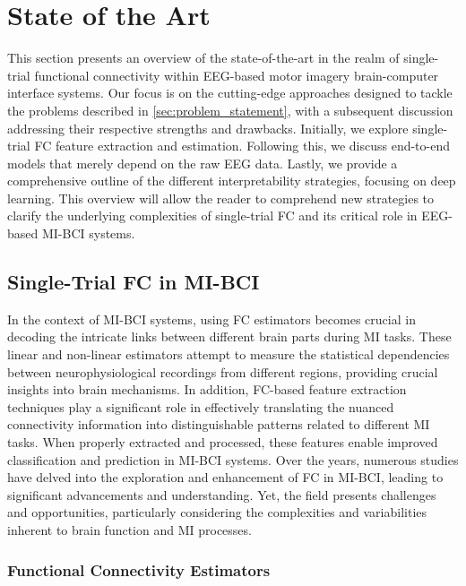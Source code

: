 \section{State of the Art}

This section presents an overview of the state-of-the-art in the realm of single-trial functional connectivity within EEG-based motor imagery brain-computer interface systems. Our focus is on the cutting-edge approaches designed to tackle the problems described in \cref{sec:problem_statement}, with a subsequent discussion addressing their respective strengths and drawbacks. Initially, we explore single-trial FC feature extraction and estimation. Following this, we discuss end-to-end models that merely depend on the raw EEG data. Lastly, we provide a comprehensive outline of the different interpretability strategies, focusing on deep learning. This overview will allow the reader to comprehend new strategies to clarify the underlying complexities of single-trial FC and its critical role in EEG-based MI-BCI systems.


\subsection{Single-Trial FC in MI-BCI \label{sec:sota1}}

In the context of MI-BCI systems, using FC estimators becomes crucial in decoding the intricate links between different brain parts during MI tasks. These linear and non-linear estimators attempt to measure the statistical dependencies between neurophysiological recordings from different regions, providing crucial insights into brain mechanisms. In addition, FC-based feature extraction techniques play a significant role in effectively translating the nuanced connectivity information into distinguishable patterns related to different MI tasks. When properly extracted and processed, these features enable improved classification and prediction in MI-BCI systems. Over the years, numerous studies have delved into the exploration and enhancement of FC in MI-BCI, leading to significant advancements and understanding. Yet, the field presents challenges and opportunities, particularly considering the complexities and variabilities inherent to brain function and MI processes.


\subsubsection{Functional Connectivity Estimators}

